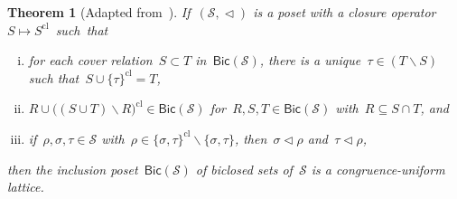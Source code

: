 \documentclass{amsart}
\newtheorem{theorem}{Theorem}[part]
\theoremstyle{definition}
\newcommand{\cS}{\mathcal{S}} %
\newcommand{\ssm}{\smallsetminus} %
\newcommand{\closure}[1]{#1^{\mathrm{cl}}} %
\newcommand{\Bicl}[1]{\mathsf{Bic}(#1)} %
\begin{document}
\begin{theorem}[Adapted from~{\cite[Thm.~5.2 \& Thm.~5.5]{McConville}}]
\label{thm:characterizationCongruenceUniform2}
If~$(\cS, \vartriangleleft)$ is a poset with a closure operator~$S \mapsto \closure{S}$~such~that
\begin{enumerate}[(i)]
\item for each cover relation~$S \subset T$ in~$\Bicl{\cS}$, there is a unique~$\tau \in (T \ssm S)$ such that~${S \cup \closure{\{\tau\}} = T}$,
\item $R \cup \closure{\big((S \cup T) \ssm R\big)} \in \Bicl{\cS}$ for~$R,S,T \in \Bicl{\cS}$ with~$R \subseteq S \cap T$, and
\item if~$\rho,\sigma,\tau \in \cS$ with~$\rho \in \closure{\{\sigma,\tau\}} \ssm \{\sigma,\tau\}$, then~$\sigma \vartriangleleft \rho$ and~$\tau \vartriangleleft \rho$,
\end{enumerate}
then the inclusion poset~$\Bicl{\cS}$ of biclosed sets of~$\cS$ is a congruence-uniform lattice.
\end{theorem}
\end{document}
